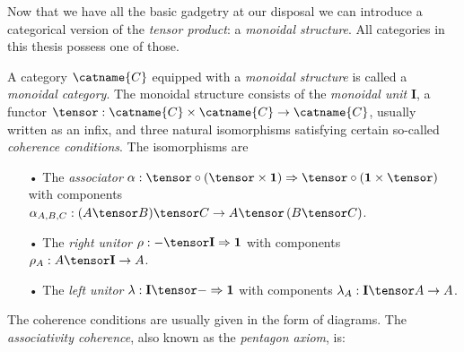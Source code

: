 \bigno Now that we have all the basic gadgetry at our disposal we can introduce a categorical version of the \emph{tensor product}: a \emph{monoidal structure}. All categories in this thesis possess one of those.

\begin{definition}
A category $\catname{C}$ equipped with a \emph{monoidal structure} is called a \emph{monoidal category}. The monoidal structure consists of the \emph{monoidal unit} $\mathbf{I}$, a functor $\tensor:\catname{C}\times\catname{C}\rightarrow\catname{C}$, usually written as an infix, and three natural isomorphisms satisfying certain so-called \emph{coherence conditions}. The isomorphisms are
\begin{itemize}
\item[•] The \emph{associator} $\alpha: \tensor \circ \left(\tensor\times \mathbf{1}\right) \Rightarrow \tensor \circ \left(\mathbf{1}\times \tensor\right)$ with components $\alpha_{A,B,C}:(A\tensor B)\tensor C\rightarrow A\tensor\left( B\tensor C \right)$.
\item[•] The \emph{right unitor} $\rho: -\tensor\mathbf{I}\Rightarrow \mathbf{1}$ with components $\rho_A:A\tensor \mathbf{I}\rightarrow A$.
\item[•] The \emph{left unitor} $\lambda: \mathbf{I}\tensor - \Rightarrow \mathbf{1}$ with components $\lambda_A: \mathbf{I}\tensor A\rightarrow A$.
\end{itemize}
The coherence conditions are usually given in the form of diagrams. The \emph{associativity coherence}, also known as the \emph{pentagon axiom}, is:
\begin{center}
\end{center}
\end{definition}
